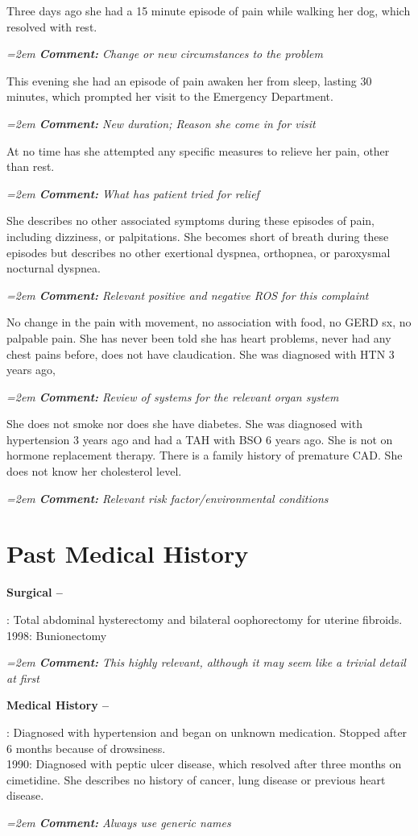 \documentclass[11pt]{article}
\newcommand{\cm}[1]{%
  \par\nopagebreak\vspace{-0.2em}%
  \begingroup\small\itshape\color{cmtcolor}%
  \hangindent=2em \hangafter=0 \hspace*{1.2em}\textbf{Comment:} #1\par%
  \endgroup}
\newcommand{\lbl}[1]{\textbf{#1}\par\nopagebreak}
\begin{document}
Three days ago she had a 15 minute episode of pain while walking her dog, which resolved with rest.
\cm{Change or new circumstances to the problem}

This evening she had an episode of pain awaken her from sleep, lasting 30 minutes, which prompted her visit to the Emergency Department.
\cm{New duration; Reason she come in for visit}

At no time has she attempted any specific measures to relieve her pain, other than rest.
\cm{What has patient tried for relief}

She describes no other associated symptoms during these episodes of pain, including dizziness, or palpitations. She becomes short of breath during these episodes but describes no other exertional dyspnea, orthopnea, or paroxysmal nocturnal dyspnea.
\cm{Relevant positive and negative ROS for this complaint}

No change in the pain with movement, no association with food, no GERD sx, no palpable pain. She has never been told she has heart problems, never had any chest pains before, does not have claudication. She was diagnosed with HTN 3 years ago,
\cm{Review of systems for the relevant organ system}

She does not smoke nor does she have diabetes. She was diagnosed with hypertension 3 years ago and had a TAH with BSO 6 years ago. She is not on hormone replacement therapy. There is a family history of premature CAD. She does not know her cholesterol level.
\cm{Relevant risk factor/environmental conditions}

\section*{Past Medical History}

\lbl{Surgical --}
1994: Total abdominal hysterectomy and bilateral oophorectomy for uterine fibroids.\\
1998: Bunionectomy
\cm{This highly relevant, although it may seem like a trivial detail at first}

\lbl{Medical History --}
1998: Diagnosed with hypertension and began on unknown medication. Stopped after 6 months because of drowsiness.\\
1990: Diagnosed with peptic ulcer disease, which resolved after three months on cimetidine. She describes no history of cancer, lung disease or previous heart disease.
\cm{Always use generic names}
\end{document}

